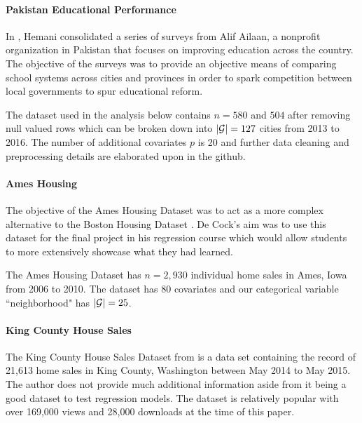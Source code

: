\documentclass{article}
\theoremstyle{plain}
\theoremstyle{definition}
\theoremstyle{remark}
\begin{document}
\paragraph{Pakistan Educational Performance}

In \cite{pakistanEducation}, Hemani consolidated a series of surveys from Alif Ailaan, a nonprofit organization in Pakistan that focuses on improving education across the country. The objective of the surveys was to provide an objective means of comparing school systems across cities and provinces in order to spark competition between local governments to spur educational reform.

The dataset used in the analysis below contains $n = 580$ and $504$ after removing null valued rows which can be broken down into $|\mathcal{G}| = 127$ cities from 2013 to 2016. The number of additional covariates $p$ is 20 and further data cleaning and preprocessing details are elaborated upon in the github.



\paragraph{Ames Housing}

The objective of the Ames Housing Dataset \cite{de2011ames} was to act as a more complex alternative to the Boston Housing Dataset \cite{harrison1978hedonic}. De Cock's aim was to use this dataset for the final project in his regression course which would allow students to more extensively showcase what they had learned.

The Ames Housing Dataset has $n=2,930$ individual home sales in Ames, Iowa from 2006 to 2010. The dataset has 80 covariates and our categorical variable ``neighborhood" has $|\mathcal{G}|=25$.

\paragraph{King County House Sales}

The King County House Sales Dataset from \cite{houseSalesKingCounty} is a data set containing the record of 21,613 home sales in King County, Washington between May 2014 to May 2015. The author does not provide much additional information aside from it being a good dataset to test regression models. The dataset is relatively popular with over 169,000 views and 28,000 downloads at the time of this paper.
\end{document}
